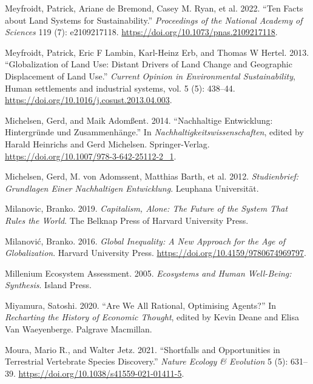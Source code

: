 \documentclass[
  a4paper,
  DIV=11,
  numbers=noendperiod,
  oneside,
  openany]{scrreprt}
\newlength{\cslhangindent}
\newenvironment{CSLReferences}[2] %
 {\begin{list}{}{%
  \setlength{\itemindent}{0pt}
  \setlength{\leftmargin}{0pt}
  \setlength{\parsep}{0pt}
  \ifodd #1
   \setlength{\leftmargin}{\cslhangindent}
   \setlength{\itemindent}{-1\cslhangindent}
  \fi
  \setlength{\itemsep}{#2\baselineskip}}}
 {\end{list}}
\begin{document}
\begin{CSLReferences}{1}{1}
{Meyfroidt, Patrick, Ariane de Bremond, Casey M. Ryan, et al.} 2022.
{``Ten Facts about Land Systems for Sustainability.''} \emph{Proceedings
of the National Academy of Sciences} 119 (7): e2109217118.
\url{https://doi.org/10.1073/pnas.2109217118}.

Meyfroidt, Patrick, Eric F Lambin, Karl-Heinz Erb, and Thomas W Hertel.
2013. {``Globalization of Land Use: Distant Drivers of Land Change and
Geographic Displacement of Land Use.''} \emph{Current Opinion in
Environmental Sustainability}, Human settlements and industrial systems,
vol. 5 (5): 438--44. \url{https://doi.org/10.1016/j.cosust.2013.04.003}.

Michelsen, Gerd, and Maik Adomßent. 2014. {``{Nachhaltige Entwicklung:
Hintergr{ü}nde und Zusammenh{ä}nge}.''} In
\emph{{Nachhaltigkeitswissenschaften}}, edited by Harald Heinrichs and
Gerd Michelsen. Springer-Verlag.
\url{https://doi.org/10.1007/978-3-642-25112-2_1}.

{Michelsen, Gerd, M. von Adomssent, Matthias Barth, et al.} 2012.
\emph{Studienbrief: {Grundlagen} Einer Nachhaltigen {Entwicklung}}.
Leuphana Universität.

Milanovic, Branko. 2019. \emph{Capitalism, {Alone}: {The Future} of the
{System} That {Rules} the {World}}. The Belknap Press of Harvard
University Press.

Milanović, Branko. 2016. \emph{Global {Inequality}: {A New Approach} for
the {Age} of {Globalization}}. Harvard University Press.
\url{https://doi.org/10.4159/9780674969797}.

Millenium Ecosystem Assessment. 2005. \emph{Ecosystems and {Human
Well-Being}: {Synthesis}}. Island Press.

Miyamura, Satoshi. 2020. {``Are {We All Rational}, {Optimising
Agents}?''} In \emph{Recharting the {History} of {Economic Thought}},
edited by Kevin Deane and Elisa Van Waeyenberge. Palgrave Macmillan.

Moura, Mario R., and Walter Jetz. 2021. {``Shortfalls and Opportunities
in Terrestrial Vertebrate Species Discovery.''} \emph{Nature Ecology \&
Evolution} 5 (5): 631--39.
\url{https://doi.org/10.1038/s41559-021-01411-5}.


\end{CSLReferences}
\end{document}
